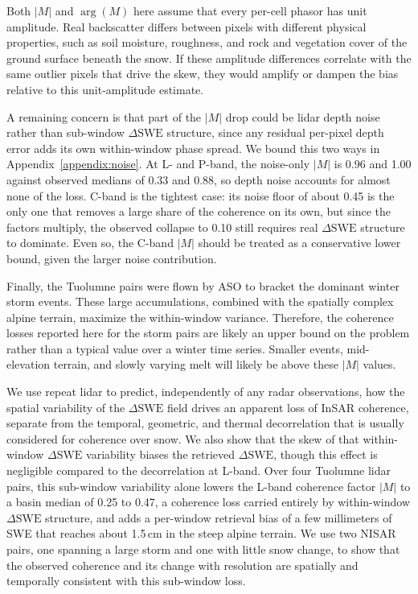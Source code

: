 \documentclass[tc, manuscript]{copernicus}
\begin{document}
Both $|M|$ and $\arg(M)$ here assume that every per-cell phasor has unit amplitude. Real backscatter differs between pixels with different physical properties, such as soil moisture, roughness, and rock and vegetation cover of the ground surface beneath the snow. If these amplitude differences correlate with the same outlier pixels that drive the skew, they would amplify or dampen the bias relative to this unit-amplitude estimate.

A remaining concern is that part of the $|M|$ drop could be lidar depth noise rather than sub-window $\Delta\mathrm{SWE}$ structure, since any residual per-pixel depth error adds its own within-window phase spread. We bound this two ways in Appendix~\ref{appendix:noise}. At L- and P-band, the noise-only $|M|$ is 0.96 and 1.00 against observed medians of 0.33 and 0.88, so depth noise accounts for almost none of the loss. C-band is the tightest case: its noise floor of about 0.45 is the only one that removes a large share of the coherence on its own, but since the factors multiply, the observed collapse to 0.10 still requires real $\Delta\mathrm{SWE}$ structure to dominate. Even so, the C-band $|M|$ should be treated as a conservative lower bound, given the larger noise contribution.

Finally, the Tuolumne pairs were flown by ASO to bracket the dominant winter storm events. These large accumulations, combined with the spatially complex alpine terrain, maximize the within-window variance. Therefore, the coherence losses reported here for the storm pairs are likely an upper bound on the problem rather than a typical value over a winter time series. Smaller events, mid-elevation terrain, and slowly varying melt will likely be above these $|M|$ values.

\conclusions  %
We use repeat lidar to predict, independently of any radar observations, how the  spatial variability of the $\Delta\mathrm{SWE}$ field drives an apparent loss of InSAR coherence, separate from the temporal, geometric, and thermal decorrelation that is usually considered for coherence over snow. We also show that the skew of that within-window $\Delta\mathrm{SWE}$ variability biases the retrieved $\Delta\mathrm{SWE}$, though this effect is negligible compared to the decorrelation at L-band. Over four Tuolumne lidar pairs, this sub-window variability alone lowers the L-band coherence factor $|M|$ to a basin median of 0.25 to 0.47, a coherence loss carried entirely by within-window $\Delta\mathrm{SWE}$ structure, and adds a per-window retrieval bias of a few millimeters of SWE that reaches about 1.5\,\unit{cm} in the steep alpine terrain. We use two NISAR pairs, one spanning a large storm and one with little snow change, to show that the observed coherence and its change with resolution are spatially and temporally consistent with this sub-window loss.
\end{document}
